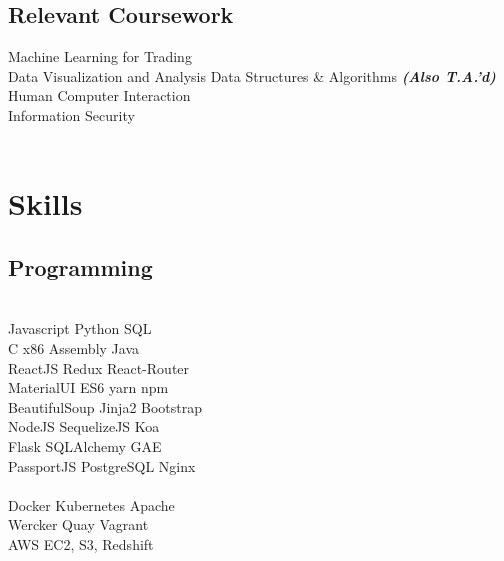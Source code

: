 \documentclass[]{deedy-resume-openfont}
\begin{document}
\begin{minipage}[t]{0.31\textwidth}
\subsection{Relevant Coursework}
Machine Learning for Trading \\
Data Visualization and Analysis
Data Structures \& Algorithms {\footnotesize \textit{\textbf{(Also T.A.'d) }}} \\
Human Computer Interaction \\
Information Security \\

\\[1\baselineskip]


\section{Skills}
\subsection{Programming}
\\[1\baselineskip]

Javascript \textbullet{} Python \textbullet{} SQL
\\[1\baselineskip]

 C \textbullet{} x86 Assembly \textbullet{} Java
\\[1\baselineskip]

ReactJS \textbullet{} Redux \textbullet{} React-Router \\
MaterialUI \textbullet{} ES6 \textbullet{} yarn \textbullet{} npm \\
BeautifulSoup \textbullet{} Jinja2 \textbullet{} Bootstrap
\\[1\baselineskip]

NodeJS \textbullet{} SequelizeJS \textbullet{} Koa\\
Flask \textbullet{} SQLAlchemy \textbullet{} GAE\\
PassportJS \textbullet{} PostgreSQL \textbullet{} Nginx \\
\\[1\baselineskip]

Docker \textbullet{} Kubernetes \textbullet{} Apache \\
Wercker \textbullet{}  Quay \textbullet{} Vagrant \\
AWS EC2, S3, Redshift
\\[1\baselineskip]


\end{minipage}
\end{document}
